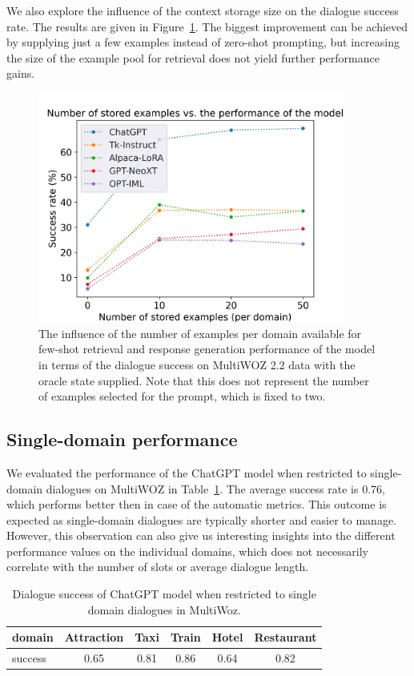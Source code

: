 We also explore the influence of the context storage size on the dialogue success rate.
The results are given in Figure~\ref{07:fig:shots}.
The biggest improvement can be achieved by supplying just a few examples instead of zero-shot prompting, but increasing the size of the example pool for retrieval does not yield further performance gains.
\begin{figure}[h]
    \centering
    \includegraphics[width=0.9\textwidth]{images/shots.png}
    \caption{The influence of the number of examples per domain available for few-shot retrieval and response generation performance of the model in terms of the dialogue success on MultiWOZ 2.2 data with the oracle state supplied. Note that this does not represent the number of examples selected for the prompt, which is fixed to two.}
    \label{07:fig:shots}
\end{figure}

\subsection{Single-domain performance}
We evaluated the performance of the ChatGPT model when restricted to single-domain dialogues on MultiWOZ in Table~\ref{tab:single-domain}.
The average success rate is 0.76, which performs better then in case of the automatic metrics.
This outcome is expected as single-domain dialogues are typically shorter and easier to manage.
However, this observation can also give us interesting insights into the different performance values on the individual domains, which does not necessarily correlate with the number of slots or average dialogue length.
\begin{table}[tp]
    \centering
    \begin{tabular}{lccccc}
    \toprule
       domain  &  \textbf{Attraction} & \textbf{Taxi} & \textbf{Train} & \textbf{Hotel} & \textbf{Restaurant} \\ 
    \midrule
        success & 0.65 & 0.81 & 0.86 & 0.64 & 0.82 \\
    \bottomrule
    \end{tabular}
    \caption{Dialogue success of ChatGPT model when restricted to single domain dialogues in MultiWoz.}
    \label{tab:single-domain}
\end{table}

